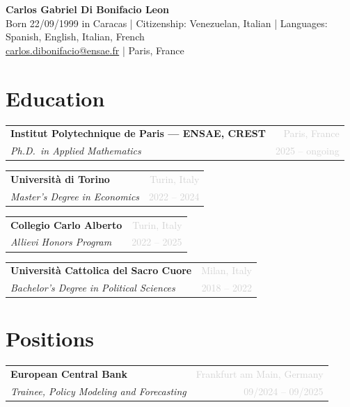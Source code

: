\documentclass[11pt, a4paper]{article}
\makeatletter
\newcommand{\cventry}[4]{%
  \noindent
  \begin{tabular*}{\linewidth}{@{}l@{\extracolsep{\fill}}r@{}}
    \textbf{#1} & \textcolor{lightgray}{\small #2} \\
    \textit{#3} & \textcolor{lightgray}{\small #4} \\
  \end{tabular*}%
  \vspace{3pt}%
}
\makeatother
\begin{document}
\pagestyle{empty}

\begin{center}
  {\LARGE\bfseries Carlos Gabriel Di Bonifacio Leon}\\[6pt]
  {\color{lightgray}
    Born 22/09/1999 in Caracas \quad|\quad
    Citizenship: Venezuelan, Italian \quad|\quad
    Languages: Spanish, English, Italian, French
  }\\[4pt]
  \href{mailto:carlos.dibonifacio@ensae.fr}{carlos.dibonifacio@ensae.fr}
  \quad|\quad
  Paris, France
\end{center}

\vspace{4pt}

\section{Education}

\cventry{Institut Polytechnique de Paris --- ENSAE, CREST}{Paris, France}%
  {Ph.D.\ in Applied Mathematics}{2025 -- ongoing}

\cventry{Università di Torino}{Turin, Italy}%
  {Master's Degree in Economics}{2022 -- 2024}

\cventry{Collegio Carlo Alberto}{Turin, Italy}%
  {Allievi Honors Program}{2022 -- 2025}

\cventry{Università Cattolica del Sacro Cuore}{Milan, Italy}%
  {Bachelor's Degree in Political Sciences}{2018 -- 2022}

\section{Positions}

\cventry{European Central Bank}{Frankfurt am Main, Germany}%
  {Trainee, Policy Modeling and Forecasting}{09/2024 -- 09/2025}

\end{document}
